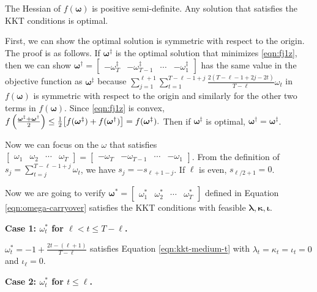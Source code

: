 		The Hessian of $f(\bm{\omega})$ is positive semi-definite. Any solution that satisfies the KKT conditions is optimal. 
		
		First, we can show the optimal solution is symmetric with respect to the origin. The proof is as follows. If $\bm{\omega}^\ddagger$ is the optimal solution that minimizes \eqref{eqn:fj1z}, then we can show $\bm{\omega}^\dagger = \begin{bmatrix}
		-\omega^\ddagger_T & -\omega^\ddagger_{T-1} & \cdots & -\omega^\ddagger_1
		\end{bmatrix}$ has the same  value in the objective function as $\bm{\omega}^\ddagger$ because $\sum_{j = 1}^{\ell+1} \sum_{t = 1}^{T - \ell-1+j} \frac{2(T - \ell-1+2j-2t)}{T - \ell}  \omega_t $ in $f(\bm{\omega})$ is symmetric with respect to the origin and similarly for the other two terms in $f(\bm{\omega})$. Since \eqref{eqn:fj1z} is convex, 
		$f\left( \frac{\bm{\omega}^\ddagger + \bm{\omega}^\dagger }{2} \right) \leq \frac{1}{2} \big[ f(\bm{\omega}^\ddagger) + f(\bm{\omega}^\dagger)  \big]  = f(\bm{\omega}^\ddagger).$
		Then if $\bm{\omega}^\ddagger$ is optimal, $\bm{\omega}^\dagger = \bm{\omega}^\ddagger$. 
		
		Now we can focus on the $\omega$ that satisfies $\begin{bmatrix}
		\omega_1 & \omega_2 & \cdots & \omega_T 
		\end{bmatrix} = \begin{bmatrix}
		-\omega_T & -\omega_{T-1} & \cdots & -\omega_1
		\end{bmatrix}$. From the definition of $s_j = \sum_{t=j}^{T - \ell-1+j} \omega_t$, we have $s_j = -s_{\ell+1-j}$. If $\ell$ is even, $s_{\ell/2+1} = 0$.
		
		
		Now we are going to verify $\bm{\omega}^\ast = \begin{bmatrix}
		\omega_1^\ast & \omega_2^\ast & \cdots & \omega_T^\ast
		\end{bmatrix}$ defined in Equation \eqref{eqn:omega-carryover} satisfies the KKT conditions with feasible $\bm{\lambda}, \bm{\kappa}, \bm{\iota}$. 
		

        \textbf{Case 1: $\omega_t^\ast$ for $\ell < t \leq T - \ell$.}
        
        $\omega_t^\ast = -1 + \frac{2t - (\ell+1)}{T - \ell}  $ satisfies Equation \eqref{eqn:kkt-medium-t} with $\lambda_t = \kappa_t = \iota_t = 0$ and $\iota_{\ell} = 0$.
	
        \textbf{Case 2: $\omega_t^\ast$ for $t \leq \ell$.}
        
